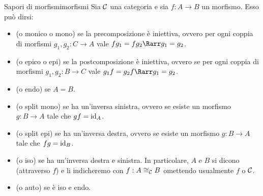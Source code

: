 \documentclass{article}
\renewcommand\C{\mc{C}}
\begin{document}
\begin{definition}{Sapori di morfismi}{morfismi}
    Sia $\C$ una categoria e sia $f: A\to B$ un morfismo. Esso può dirsi:\begin{itemize}
        \item {} (o monico o mono) se la precomposizione è iniettiva, ovvero per ogni coppia di morfismi $g_1, g_2 : C\to A$ vale $fg_1 = fg_2 \Rarr g_1=g_2$.
        \item {} (o epico o epi) se la postcomposizione è iniettiva, ovvero se per ogni coppia di morfismi $g_1, g_2 : B\to C$ vale $g_1f = g_2f \Rarr g_1=g_2$.
        \item {} (o endo) se $A=B$.
        \item {} (o split mono) se ha un'inversa sinistra, ovvero se esiste un morfismo $g:B\to A$ tale che $gf = \operatorname{id}_A$.
        \item {} (o split epi) se ha un'inversa destra, ovvero se esiste un morfismo $g:B\to A$ tale che $fg = \operatorname{id}_B$.
        \item {} (o iso) se ha un'inversa destra e sinistra. In particolare, $A$ e $B$ si dicono  (attraverso $f$) e li indicheremo con $f:A\cong_\C B$ omettendo usualmente $f$ o $\C$.
        \item {} (o auto) se è iso e endo.
    \end{itemize}    
\end{definition}
\end{document}
